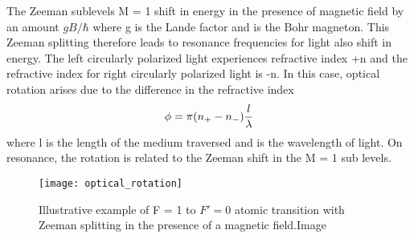 \documentclass[12pt]{report}
\begin{document}
The Zeeman sublevels M = 1 shift in energy in the presence of magnetic field by an amount $gB/\hbar$ where g is the Lande factor and is the Bohr magneton. This Zeeman splitting therefore leads to resonance frequencies for light also shift in energy. The left circularly polarized light experiences refractive index +n and the refractive index for right circularly polarized light is -n. In this case, optical rotation arises due to the difference in the refractive index 
\begin{equation}
\label{eq:emc}
\phi = \pi(n_+-n_{-})\frac{l}{\lambda} \\
\end{equation}
where l is the length of the medium traversed and is the wavelength of light. On resonance, the rotation is related to the Zeeman shift in the M = 1 sub levels.
\begin{figure}[h]
\centering
\texttt{[image: optical\_rotation]}
\caption{Illustrative example of F = 1 to $F' = 0$ atomic transition with Zeeman
splitting in the presence of a magnetic field.Image\cite{Budker2002JU2}}
\end{figure}
\end{document}
